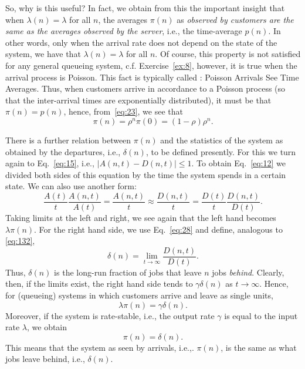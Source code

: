So, why is this useful? In fact, we obtain from this the important
insight that when $\lambda(n) = \lambda$ for all $n$, the averages
$\pi(n)$ as \emph{observed by customers are the same as the averages
  observed by the server}, i.e., the time-average $p(n)$. In other
words, only when the arrival rate does not depend on the state of the
system, we have that $\lambda(n)=\lambda$ for all $n$. Of course, this
property is not satisfied for any general queueing system,
c.f. Exercise~\ref{ex:8}, however, it is true when the arrival process
is Poisson. This fact is typically called : Poisson
Arrivals See Time Averages.
Thus, when customers arrive in accordance to a Poisson process (so
that the inter-arrival times are exponentially distributed), it must be
that $\pi(n) = p(n)$, hence, from~\eqref{eq:23}, we see that
\begin{equation*}
  \pi(n) = \rho^n \pi(0) =  (1-\rho)\rho^n.
\end{equation*}


There is a further relation between $\pi(n)$ and the statistics of the
system as obtained by the departures, i.e., $\delta(n)$, to be defined
presently. For this we turn again to Eq.~\eqref{eq:15}, i.e.,
$|A(n,t) - D(n,t)| \leq 1$. To obtain Eq.~\eqref{eq:12} we divided
both sides of this equation by the time the system spends in a certain
state. We can also use another form:
\begin{equation*}
\frac{A(t)}t \frac{A(n,t)}{A(t)} = \frac{A(n,t)}t \approx \frac{D(n,t)}t 
= \frac{D(t)}t \frac{D(n,t)}{D(t)}.
\end{equation*}
Taking limits at the left and right, we see again that the left hand
becomes $\lambda \pi(n)$. For the right hand side, we use
Eq.~\eqref{eq:28} and define, analogous to \eqref{eq:132}, 
\begin{equation}
  \label{eq:33}
  \delta(n) = \lim_{t\to\infty} \frac{D(n,t)}{D(t)}.
\end{equation}
Thus, $\delta(n)$ is the long-run fraction of jobs that leave $n$ jobs
\emph{behind}. Clearly, then, if the limits exist, the right hand side
tends to $\gamma \delta(n)$ as $t\to\infty$. Hence, for (queueing)
systems in which customers arrive and leave as single units,
\begin{equation}
  \label{eq:36}
  \lambda \pi(n) = \gamma \delta(n).
\end{equation}
Moreover, if the system is rate-stable, i.e., the output rate $\gamma$ is equal to the input rate $\lambda$, we obtain
\begin{equation}
  \label{eq:39}
  \pi(n) = \delta(n).
\end{equation}
This means that the system as seen by arrivals, i.e.,. $\pi(n)$, is
the same as what jobs leave behind, i.e., $\delta(n)$.

